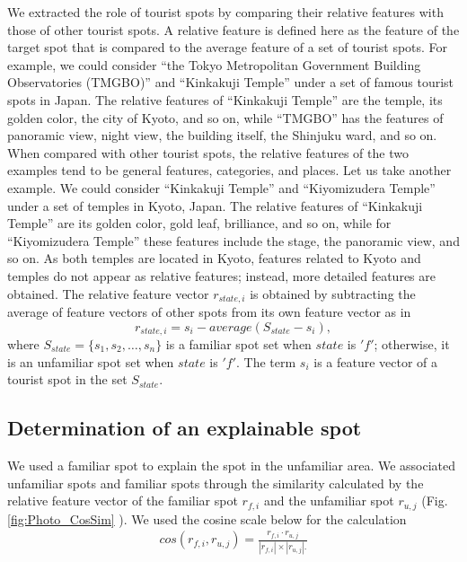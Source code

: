 \documentclass[journal]{IAENGtran}
\begin{document}
   We extracted the role of tourist spots by comparing their relative features with those of other tourist spots. A relative feature is defined here as the feature of the target spot that is compared to the average feature of a set of tourist spots. For example, we could consider ``the Tokyo Metropolitan Government Building Observatories (TMGBO)'' and ``Kinkakuji Temple'' under a set of famous tourist spots in Japan. The relative features of ``Kinkakuji Temple'' are the temple, its golden color, the city of Kyoto, and so on, while ``TMGBO'' has the features of panoramic view, night view, the building itself, the Shinjuku ward, and so on. When compared with other tourist spots, the relative features of the two examples tend to be general features, categories, and places.
   Let us take another example. We could consider ``Kinkakuji Temple'' and ``Kiyomizudera Temple'' under a set of temples in Kyoto, Japan. The relative features of ``Kinkakuji Temple'' are its golden color, gold leaf, brilliance, and so on, while for ``Kiyomizudera Temple'' these features include the stage, the panoramic view, and so on. As both temples are located in Kyoto, features related to Kyoto and temples do not appear as relative features; instead, more detailed features are obtained.
   The relative feature vector $r_{state,i}$  is obtained by subtracting the average of feature vectors of other spots from its own feature vector as in
\begin{equation}
  r_{state,i}=s_i-average(S_{state}-s_i),
  \label{math:Vector difference}
\end{equation}
where $S_{state} =\{s_1,s_2,\dots,s_n\}$ is a familiar spot set when $state$ is $'f'$; otherwise, it is an unfamiliar spot set when $state$ is $'f'$. The term $s_i$ is a feature vector of a tourist spot in the set $S_{state}$.

\subsection{Determination of an explainable spot}
\label{subsec:Determination of an explainable spot}
   We used a familiar spot to explain the spot in the unfamiliar area. We associated unfamiliar spots and familiar spots through the similarity calculated by the relative feature vector of the familiar spot $r_{f,i}$ and the unfamiliar spot $r_{u,j}$ (Fig. \ref{fig:Photo_CosSim} ). We used  the cosine scale below for the calculation
\begin{eqnarray}
  cos(r_{f,i},r_{u,j})=\frac{r_{f,i} \cdot r_{u,j}}{|r_{f,i}| \times |r_{u,j}|.}
  \label{math:CosSim}
\end{eqnarray}
\end{document}
